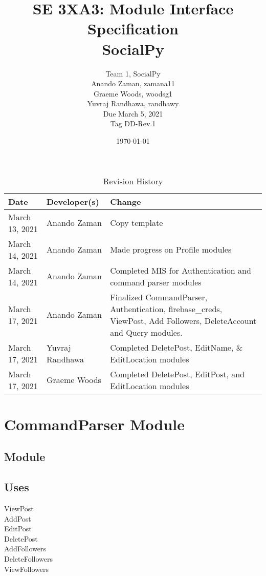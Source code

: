 \documentclass[12pt, titlepage]{article}
\title{SE 3XA3: Module Interface Specification\\SocialPy}
\author{
	Team 1, SocialPy
		\\ Anando Zaman, zamana11
        \\ Graeme Woods, woodsg1
        \\ Yuvraj Randhawa, randhawy
        \\ Due March 5, 2021
        \\ Tag DD-Rev.1
}
\date{\today}
\begin{document}
\maketitle

\tableofcontents
\listoftables
\listoffigures

\begin{table}[!htbp]
    \caption{Revision History} \label{RevisionHistory}
    \begin{tabularx}{\textwidth}{llX}
        \toprule
            \textbf{Date} & \textbf{Developer(s)} & \textbf{Change}\\
        \midrule
            March 13, 2021 & Anando Zaman & Copy template\\
            March 14, 2021 & Anando Zaman & Made progress on Profile modules\\
            March 14, 2021 & Anando Zaman & Completed MIS for Authentication and command parser modules\\
            March 17, 2021 & Anando Zaman & Finalized CommandParser, Authentication, firebase\_creds, ViewPost, Add Followers, DeleteAccount and Query modules.\\
            March 17, 2021 & Yuvraj Randhawa & Completed DeletePost, EditName, \& EditLocation modules\\
            March 17, 2021 & Graeme Woods & Completed DeletePost, EditPost, and EditLocation modules \\
        \bottomrule
    \end{tabularx}
\end{table}

\newpage
{}
\section* {CommandParser Module}

\subsection*{Module}

\subsection* {Uses}
ViewPost\\
AddPost\\
EditPost\\
DeletePost\\
AddFollowers\\
DeleteFollowers\\
ViewFollowers\\
\end{document}
